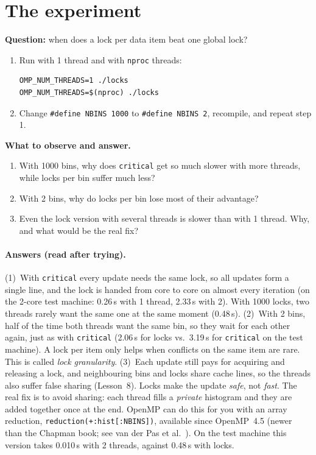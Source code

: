 \documentclass[11pt,a4paper]{article}
\begin{document}
\section{The experiment}
\begin{experiment}
\textbf{Question:} when does a lock per data item beat one global lock?
\begin{enumerate}
  \item Run with 1 thread and with \texttt{nproc} threads:
\begin{lstlisting}[style=sh]
OMP_NUM_THREADS=1 ./locks
OMP_NUM_THREADS=$(nproc) ./locks
\end{lstlisting}
  \item Change \texttt{\#define NBINS 1000} to \texttt{\#define NBINS 2}, recompile, and
        repeat step 1.
\end{enumerate}
\textbf{What to observe and answer.}
\begin{enumerate}
  \item With 1000 bins, why does \texttt{critical} get so much slower with more threads,
        while locks per bin suffer much less?
  \item With 2 bins, why do locks per bin lose most of their advantage?
  \item Even the lock version with several threads is slower than with 1 thread. Why,
        and what would be the real fix?
\end{enumerate}
\end{experiment}

\paragraph{Answers (read after trying).}
(1)~With \texttt{critical} every update needs the same lock, so all updates form a single
line, and the lock is handed from core to core on almost every iteration (on the 2-core
test machine: 0.26\,s with 1 thread, 2.33\,s with 2). With 1000 locks, two threads rarely
want the same one at the same moment (0.48\,s).
(2)~With 2 bins, half of the time both threads want the same bin, so they wait for each
other again, just as with \texttt{critical} (2.06\,s for locks vs.\ 3.19\,s for
\texttt{critical} on the test machine). A lock per item only helps when conflicts on the
same item are rare. This is called \emph{lock granularity}.
(3)~Each update still pays for acquiring and releasing a lock, and neighbouring bins and
locks share cache lines, so the threads also suffer false sharing (Lesson~8). Locks make
the update \emph{safe}, not \emph{fast}. The real fix is to avoid sharing: each thread
fills a \emph{private} histogram and they are added together once at the end. OpenMP can do
this for you with an array reduction, \texttt{reduction(+:hist[:NBINS])}, available since
OpenMP~4.5 (newer than the Chapman book; see van der Pas et al.~\cite{vdp}). On the test
machine this version takes 0.010\,s with 2 threads, against 0.48\,s with locks.
\end{document}
